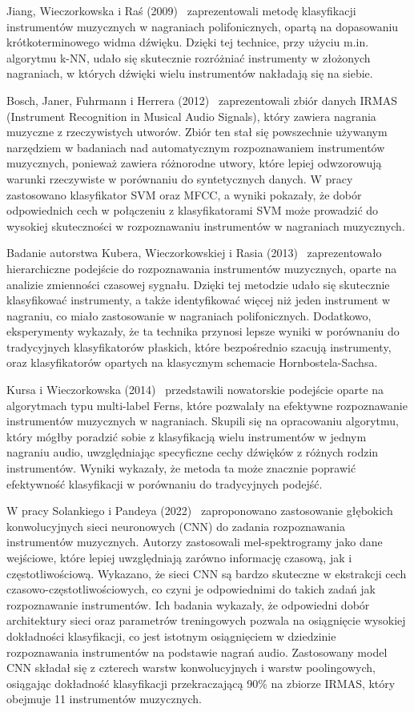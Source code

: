 \documentclass{SGGW-thesis}
\begin{document}
Jiang, Wieczorkowska i Raś (2009)~\cite{jiang2009music} zaprezentowali metodę klasyfikacji instrumentów muzycznych w nagraniach polifonicznych, opartą na dopasowaniu krótkoterminowego widma dźwięku. Dzięki tej technice, przy użyciu m.in. algorytmu k-NN, udało się skutecznie rozróżniać instrumenty w złożonych nagraniach, w których dźwięki wielu instrumentów nakładają się na siebie.

Bosch, Janer, Fuhrmann i Herrera (2012)~\cite{bosch2012comparison} zaprezentowali zbiór danych IRMAS (Instrument Recognition in Musical Audio Signals), który zawiera nagrania muzyczne z rzeczywistych utworów. Zbiór ten stał się powszechnie używanym narzędziem w badaniach nad automatycznym rozpoznawaniem instrumentów muzycznych, ponieważ zawiera różnorodne utwory, które lepiej odwzorowują warunki rzeczywiste w porównaniu do syntetycznych danych. W pracy zastosowano klasyfikator SVM oraz MFCC, a wyniki pokazały, że dobór odpowiednich cech w połączeniu z klasyfikatorami SVM może prowadzić do wysokiej skuteczności w rozpoznawaniu instrumentów w nagraniach muzycznych.

Badanie autorstwa Kubera, Wieczorkowskiej i Rasia (2013)~\cite{kubera2013time} zaprezentowało hierarchiczne podejście do rozpoznawania instrumentów muzycznych, oparte na analizie zmienności czasowej sygnału. Dzięki tej metodzie udało się skutecznie klasyfikować instrumenty, a także identyfikować więcej niż jeden instrument w nagraniu, co miało zastosowanie w nagraniach polifonicznych. Dodatkowo, eksperymenty wykazały, że ta technika przynosi lepsze wyniki w porównaniu do tradycyjnych klasyfikatorów płaskich, które bezpośrednio szacują instrumenty, oraz klasyfikatorów opartych na klasycznym schemacie Hornbostela-Sachsa.

Kursa i Wieczorkowska (2014)~\cite{kursa2014multi} przedstawili nowatorskie podejście oparte na algorytmach typu multi-label Ferns, które pozwalały na efektywne rozpoznawanie instrumentów muzycznych w nagraniach. Skupili się na opracowaniu algorytmu, który mógłby poradzić sobie z klasyfikacją wielu instrumentów w jednym nagraniu audio, uwzględniając specyficzne cechy dźwięków z różnych rodzin instrumentów. Wyniki wykazały, że metoda ta może znacznie poprawić efektywność klasyfikacji w porównaniu do tradycyjnych podejść.

W pracy Solankiego i Pandeya (2022)~\cite{solanki2022music} zaproponowano zastosowanie głębokich konwolucyjnych sieci neuronowych (CNN) do zadania rozpoznawania instrumentów muzycznych. Autorzy zastosowali mel-spektrogramy jako dane wejściowe, które lepiej uwzględniają zarówno informację czasową, jak i częstotliwościową. Wykazano, że sieci CNN są bardzo skuteczne w ekstrakcji cech czasowo-częstotliwościowych, co czyni je odpowiednimi do takich zadań jak rozpoznawanie instrumentów. Ich badania wykazały, że odpowiedni dobór architektury sieci oraz parametrów treningowych pozwala na osiągnięcie wysokiej dokładności klasyfikacji, co jest istotnym osiągnięciem w dziedzinie rozpoznawania instrumentów na podstawie nagrań audio. Zastosowany model CNN składał się z czterech warstw konwolucyjnych i warstw poolingowych, osiągając dokładność klasyfikacji przekraczającą 90\% na zbiorze IRMAS, który obejmuje 11 instrumentów muzycznych.
\end{document}
